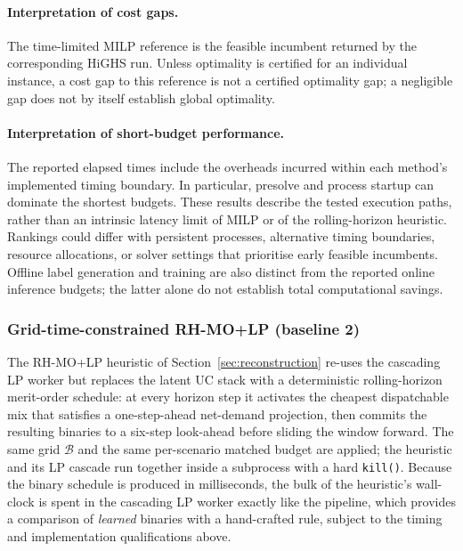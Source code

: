\documentclass{article}
\begin{document}
\paragraph{Interpretation of cost gaps.}
The time-limited MILP reference is the feasible incumbent returned by the corresponding HiGHS run. Unless optimality is certified for an individual instance, a cost gap to this reference is not a certified optimality gap; a negligible gap does not by itself establish global optimality.

\paragraph{Interpretation of short-budget performance.}
The reported elapsed times include the overheads incurred within each method's implemented timing boundary. In particular, presolve and process startup can dominate the shortest budgets. These results describe the tested execution paths, rather than an intrinsic latency limit of MILP or of the rolling-horizon heuristic. Rankings could differ with persistent processes, alternative timing boundaries, resource allocations, or solver settings that prioritise early feasible incumbents. Offline label generation and training are also distinct from the reported online inference budgets; the latter alone do not establish total computational savings.

\subsubsection{Grid-time-constrained RH-MO+LP (baseline 2)}
\label{sec:protocol_heuristic}
The RH-MO+LP heuristic of Section~\ref{sec:reconstruction} re-uses the cascading LP worker but replaces the latent UC stack with a deterministic rolling-horizon merit-order schedule: at every horizon step it activates the cheapest dispatchable mix that satisfies a one-step-ahead net-demand projection, then commits the resulting binaries to a six-step look-ahead before sliding the window forward. The same grid $\mathcal{B}$ and the same per-scenario matched budget are applied; the heuristic and its LP cascade run together inside a subprocess with a hard \texttt{kill()}. Because the binary schedule is produced in milliseconds, the bulk of the heuristic's wall-clock is spent in the cascading LP worker exactly like the pipeline, which provides a comparison of \emph{learned} binaries with a hand-crafted rule, subject to the timing and implementation qualifications above.
\end{document}
